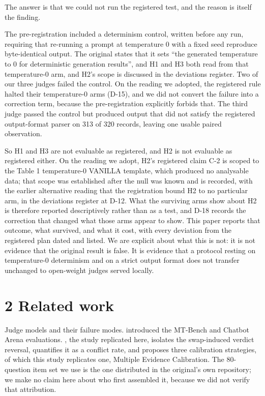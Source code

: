 The answer is that we could not run the registered test, and the reason is itself the finding.

The pre-registration included a determinism control, written before any run, requiring that
re-running a prompt at temperature 0 with a fixed seed reproduce byte-identical output. The original
states that it sets ``the generated temperature to 0 for deterministic generation results'', and
H1 and H3 both read from that temperature-0 arm, and H2's scope is discussed in the deviations register. Two of our three judges
failed the control. On the reading we adopted, the registered rule halted their temperature-0 arms (D-15), and we did not convert the
failure into a correction term, because the pre-registration explicitly forbids that. The third
judge passed the control but produced output that did not satisfy the registered output-format
parser on 313 of 320 records, leaving one usable paired observation.

So H1 and H3 are not evaluable as registered, and H2 is not evaluable as registered either. On the
reading we adopt, H2's registered claim C-2 is scoped to the Table 1 temperature-0 VANILLA
template, which produced no analysable data; that scope was established after the null was known and
is recorded, with the earlier alternative reading that the registration bound H2 to no particular
arm, in the deviations register at D-12. What the surviving arms show about H2 is therefore
reported descriptively rather than as a test, and D-18 records the correction that changed
what those arms appear to show. This paper reports that outcome, what survived,
and what it cost, with every deviation from the registered plan dated and listed. We are explicit
about what this is not: it is not evidence that the original result is false. It is evidence that a
protocol resting on temperature-0 determinism and on a strict output format does not transfer
unchanged to open-weight judges served locally.

\section{2 Related work}\label{related-work}

Judge models and their failure modes. \textcite{zheng2023} introduced the MT-Bench and Chatbot Arena
evaluations. \textcite{wang2024}, the study replicated here, isolates the swap-induced verdict
reversal, quantifies it as a conflict rate, and proposes three calibration strategies, of which this study replicates one, Multiple Evidence Calibration. The 80-question
item set we use is the one distributed in the original's own repository; we make no claim here about
who first assembled it, because we did not verify that attribution.

